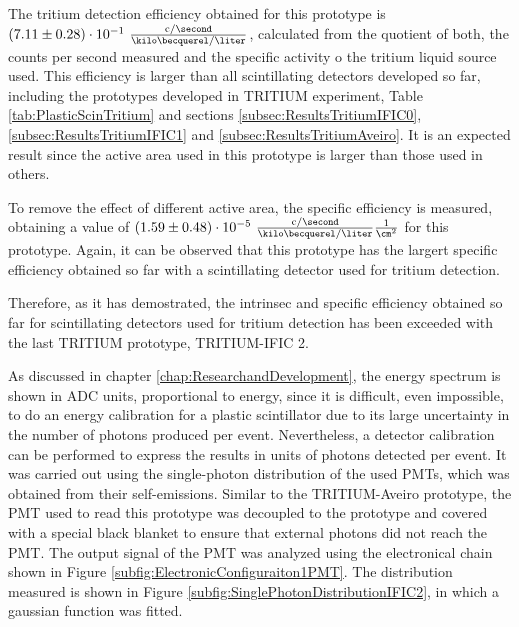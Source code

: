 The tritium detection efficiency obtained for this prototype is $(7.11 \pm 0.28)\cdot{} 10^{-1}~ \frac{\text{c}/\second}{\kilo\becquerel/\liter}$, calculated from the quotient of both, the counts per second measured and the specific activity o the tritium liquid source used. This efficiency is larger than all scintillating detectors developed so far, including the prototypes developed in TRITIUM experiment, Table \ref{tab:PlasticScinTritium} and sections \ref{subsec:ResultsTritiumIFIC0}, \ref{subsec:ResultsTritiumIFIC1} and \ref{subsec:ResultsTritiumAveiro}. It is an expected result since the active area used in this prototype is larger than those used in others.

To remove the effect of different active area, the specific efficiency is measured, obtaining a value of $(1.59 \pm 0.48)\cdot{} 10^{-5}~ \frac{\text{c}/\second}{\kilo\becquerel/\liter}\frac{1}{\cm^{2}}$ for this prototype. Again, it can be observed that this prototype has the largert specific efficiency obtained so far with a scintillating detector used for tritium detection.

Therefore, as it has demostrated, the intrinsec and specific efficiency obtained so far for scintillating detectors used for tritium detection has been exceeded with the last TRITIUM prototype, TRITIUM-IFIC 2.

As discussed in chapter \ref{chap:ResearchandDevelopment}, the energy spectrum is shown in ADC units, proportional to energy, since it is difficult, even impossible, to do an energy calibration for a plastic scintillator due to its large uncertainty in the number of photons produced per event. Nevertheless, a detector calibration can be performed to express the results in units of photons detected per event. It was carried out using the single-photon distribution of the used PMTs, which was obtained from their self-emissions. Similar to the TRITIUM-Aveiro prototype, the PMT used to read this prototype was decoupled to the prototype and covered with a special black blanket to ensure that external photons did not reach the PMT. The output signal of the PMT was analyzed using the electronical chain shown in Figure \ref{subfig:ElectronicConfiguraiton1PMT}. The distribution measured is shown in Figure \ref{subfig:SinglePhotonDistributionIFIC2}, in which a gaussian function was fitted.

